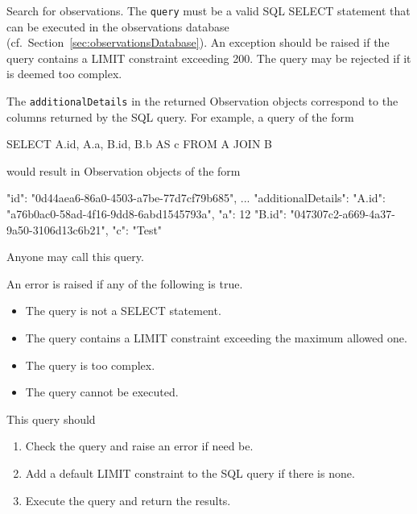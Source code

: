 Search for observations. The \verb|query| must be a valid SQL SELECT statement that can be executed in the observations database (cf.~Section~\ref{sec:observationsDatabase}). An exception should be raised if the query contains a LIMIT constraint exceeding 200. The query may be rejected if it is deemed too complex.

The \verb|additionalDetails| in the returned Observation objects correspond to the columns returned by the SQL query. For example, a query of the form

\begin{code}
SELECT A.id, A.a, B.id, B.b AS c FROM A JOIN B
\end{code}

would result in Observation objects of the form

\begin{code}
{
  "id": "0d44aea6-86a0-4503-a7be-77d7cf79b685",
  ...
  "additionalDetails": {
    "A.id": "a76b0ac0-58ad-4f16-9dd8-6abd1545793a",
    "a": 12
    "B.id": "047307c2-a669-4a37-9a50-3106d13c6b21",
    "c": "Test"
  }
}
\end{code}

\restrictions

Anyone may call this query.

\errors

An error is raised if any of the following is true.

\begin{itemize}
    \item The query is not a SELECT statement.
    \item The query contains a LIMIT constraint exceeding the maximum allowed one.
    \item The query is too complex.
    \item The query cannot be executed.
\end{itemize}

\functionality

This query should

\begin{enumerate}
    \item Check the query and raise an error if need be.
    \item Add a default LIMIT constraint to the SQL query if there is none.
    \item Execute the query and return the results.
\end{enumerate}


